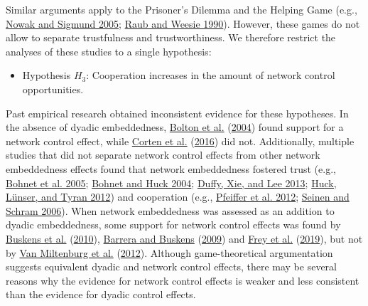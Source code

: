 \documentclass[
  11pt,
]{article}
\providecommand{\tightlist}{%
  \setlength{\itemsep}{0pt}\setlength{\parskip}{0pt}}
\begin{document}
\noindent
Similar arguments apply to the Prisoner's Dilemma and the Helping Game (e.g., \protect\hyperlink{ref-nowak_sigmund_evolution_2005}{Nowak and Sigmund 2005}; \protect\hyperlink{ref-raub_weesie_reputation_1990}{Raub and Weesie 1990}).
However, these games do not allow to separate trustfulness and trustworthiness.
We therefore restrict the analyses of these studies to a single hypothesis:

\begin{itemize}
\tightlist
\item
  Hypothesis \(H_3\): Cooperation increases in the amount of network control opportunities.
\end{itemize}

Past empirical research obtained inconsistent evidence for these hypotheses.
In the absence of dyadic embeddedness, \protect\hyperlink{ref-bolton_electronic_2004}{Bolton et al.} (\protect\hyperlink{ref-bolton_electronic_2004}{2004}) found support for a network control effect, while \protect\hyperlink{ref-corten_etal_reputation_2016}{Corten et al.} (\protect\hyperlink{ref-corten_etal_reputation_2016}{2016}) did not.
Additionally, multiple studies that did not separate network control effects from other network embeddedness effects found that network embeddedness fostered trust (e.g., \protect\hyperlink{ref-bohnet_learning_2005}{Bohnet et al. 2005}; \protect\hyperlink{ref-bohnet_huck_2004}{Bohnet and Huck 2004}; \protect\hyperlink{ref-duffy2013social}{Duffy, Xie, and Lee 2013}; \protect\hyperlink{ref-huck_competition_2012}{Huck, Lünser, and Tyran 2012}) and cooperation (e.g., \protect\hyperlink{ref-pfeiffer_etal_value_2012}{Pfeiffer et al. 2012}; \protect\hyperlink{ref-seinen_schram_social_2006}{Seinen and Schram 2006}).
When network embeddedness was assessed as an addition to dyadic embeddedness, some support for network control effects was found by \protect\hyperlink{ref-buskens_raub_veer_triads_2010}{Buskens et al.} (\protect\hyperlink{ref-buskens_raub_veer_triads_2010}{2010}), \protect\hyperlink{ref-barrera_buskens_third_2009}{Barrera and Buskens} (\protect\hyperlink{ref-barrera_buskens_third_2009}{2009}) and \protect\hyperlink{ref-frey_buskens_investments_2019}{Frey et al.} (\protect\hyperlink{ref-frey_buskens_investments_2019}{2019}), but not by \protect\hyperlink{ref-miltenburg_buskens_triads_2012}{Van Miltenburg et al.} (\protect\hyperlink{ref-miltenburg_buskens_triads_2012}{2012}).
Although game-theoretical argumentation suggests equivalent dyadic and network control effects, there may be several reasons why the evidence for network control effects is weaker and less consistent than the evidence for dyadic control effects.
\end{document}
